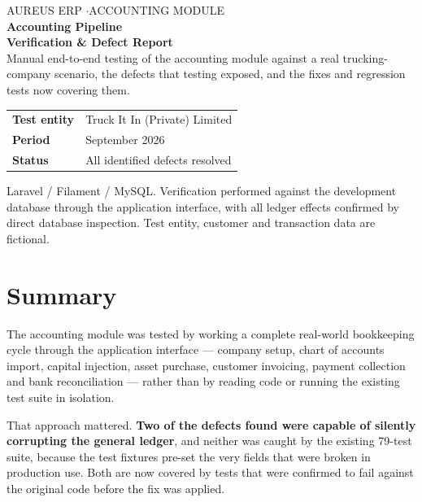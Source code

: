 \documentclass[11pt,a4paper]{article}
\begin{document}
\begin{titlepage}
\vspace*{3cm}
{\footnotesize\textsf{\textcolor{accent}{AUREUS ERP \quad$\cdot$\quad ACCOUNTING MODULE}}}\\[1.1em]
{\Huge\bfseries Accounting Pipeline\\[0.25em] Verification \& Defect Report}\\[1.6em]
{\large\color{inksoft}
Manual end-to-end testing of the accounting module against a real trucking-company
scenario, the defects that testing exposed, and the fixes and regression tests now
covering them.}\\[2.5em]
\begin{tabular}{@{}ll@{}}
\textsf{\small\textbf{Test entity}} & Truck It In (Private) Limited\\[2pt]
\textsf{\small\textbf{Period}}      & September 2026\\[2pt]
\textsf{\small\textbf{Status}}      & All identified defects resolved\\
\end{tabular}
\vfill
{\footnotesize\color{muted}
Laravel / Filament / MySQL. Verification performed against the development database through
the application interface, with all ledger effects confirmed by direct database inspection.
Test entity, customer and transaction data are fictional.}
\end{titlepage}

\tableofcontents
\newpage

\section{Summary}

The accounting module was tested by working a complete real-world bookkeeping cycle through
the application interface --- company setup, chart of accounts import, capital injection, asset
purchase, customer invoicing, payment collection and bank reconciliation --- rather than by
reading code or running the existing test suite in isolation.

That approach mattered. \textbf{Two of the defects found were capable of silently corrupting the
general ledger}, and neither was caught by the existing 79-test suite, because the test fixtures
pre-set the very fields that were broken in production use. Both are now covered by tests that
were confirmed to fail against the original code before the fix was applied.
\end{document}
